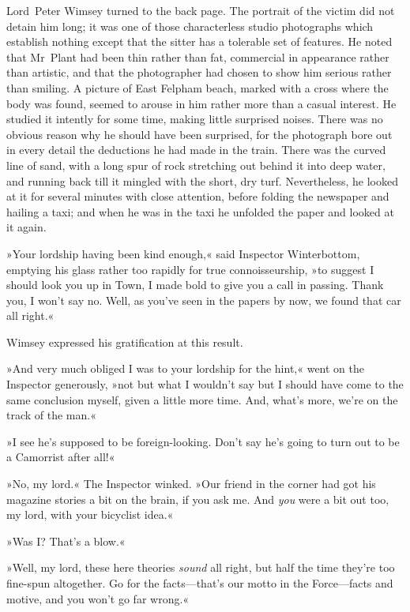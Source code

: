 Lord~Peter Wimsey turned to the back page. The portrait of the victim did not detain him long; it was one of those characterless studio photographs which establish nothing except that the sitter has a tolerable set of features. He noted that Mr~Plant had been thin rather than fat, commercial in appearance rather than artistic, and that the photographer had chosen to show him serious rather than smiling. A picture of East Felpham beach, marked with a cross where the body was found, seemed to arouse in him rather more than a casual interest. He studied it intently for some time, making little surprised noises. There was no obvious reason why he should have been surprised, for the photograph bore out in every detail the deductions he had made in the train. There was the curved line of sand, with a long spur of rock stretching out behind it into deep water, and running back till it mingled with the short, dry turf. Nevertheless, he looked at it for several minutes with close attention, before folding the newspaper and hailing a taxi; and when he was in the taxi he unfolded the paper and looked at it again.

»Your lordship having been kind enough,« said Inspector Winterbottom, emptying his glass rather too rapidly for true connoisseurship, »to suggest I should look you up in Town, I made bold to give you a call in passing. Thank you, I won't say no. Well, as you've seen in the papers by now, we found that car all right.«

Wimsey expressed his gratification at this result.

»And very much obliged I was to your lordship for the hint,« went on the Inspector generously, »not but what I wouldn't say but I should have come to the same conclusion myself, given a little more time. And, what's more, we're on the track of the man.«

»I see he's supposed to be foreign-looking. Don't say he's going to turn out to be a Camorrist after all!«

»No, my lord.« The Inspector winked. »Our friend in the corner had got his magazine stories a bit on the brain, if you ask me. And \textit{you} were a bit out too, my lord, with your bicyclist idea.«

»Was I? That's a blow.«

»Well, my lord, these here theories \textit{sound} all right, but half the time they're too fine-spun altogether. Go for the facts—that's our motto in the Force—facts and motive, and you won't go far wrong.«

